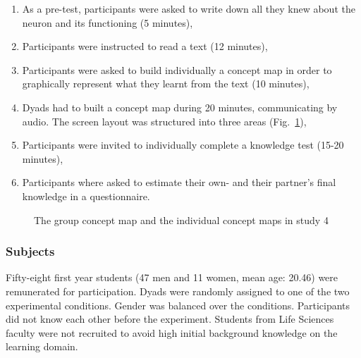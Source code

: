 \documentclass[natbib]{svjour3}
\begin{document}
\begin{enumerate}

    \item As a pre-test, participants were asked to write down all they knew
        about the neuron and its functioning (5 minutes),

    \item Participants were instructed to read a text (12 minutes),

    \item Participants were asked to build individually a concept map in order to
        graphically represent what they learnt from the text (10 minutes),

    \item Dyads had to built a concept map during 20 minutes, communicating by
        audio.  The screen layout was structured into three areas
        (Fig.~\ref{study4:concept_map}),

    \item Participants were invited to individually complete a knowledge test
        (15-20 minutes),

    \item Participants where asked to estimate their own- and their partner's
        final knowledge in a questionnaire. 

\end{enumerate}



\begin{figure}
    \centering
    \caption{The group concept map and the individual concept maps in study
    4}
    \label{study4:concept_map}
\end{figure}

\subsubsection*{Subjects}

Fifty-eight first year students (47 men and 11 women, mean age: 20.46)
were remunerated for participation. Dyads were randomly assigned to one of the
two experimental conditions. Gender was balanced over the conditions.
Participants did not know each other before the experiment. Students from Life
Sciences faculty were not recruited to avoid high initial background knowledge on the
learning domain.
\end{document}
